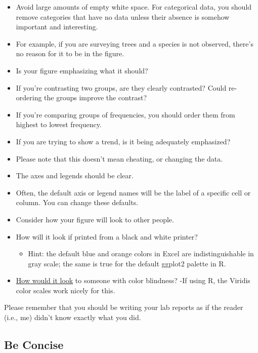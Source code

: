\documentclass[]{book}
\providecommand{\tightlist}{%
  \setlength{\itemsep}{0pt}\setlength{\parskip}{0pt}}
\begin{document}
\begin{itemize}
\tightlist
\item
  Avoid large amounts of empty white space. For categorical data, you
  should remove categories that have no data unless their absence is
  somehow important and interesting.
\item
  For example, if you are surveying trees and a species is not observed,
  there's no reason for it to be in the figure.
\item
  Is your figure emphasizing what it should?
\item
  If you're contrasting two groups, are they clearly contrasted? Could
  re-ordering the groups improve the contrast?
\item
  If you're comparing groups of frequencies, you should order them from
  highest to lowest frequency.
\item
  If you are trying to show a trend, is it being adequately emphasized?
\item
  Please note that this doesn't mean cheating, or changing the data.
\item
  The axes and legends should be clear.
\item
  Often, the default axis or legend names will be the label of a
  specific cell or column. You can change these defaults.
\item
  Consider how your figure will look to other people.
\item
  How will it look if printed from a black and white printer?

  \begin{itemize}
  \tightlist
  \item
    Hint: the default blue and orange colors in Excel are
    indistinguishable in gray scale; the same is true for the default
    ggplot2 palette in R.
  \end{itemize}
\item
  \href{https://venngage.com/blog/color-blind-friendly-palette/}{How
  would it look} to someone with color blindness? -If using R, the
  Viridis color scales work nicely for this.
\end{itemize}

Please remember that you should be writing your lab reports as if the
reader (i.e., me) didn't know exactly what you did.

\subsection{Be Concise}\label{be-concise-1}
\end{document}
